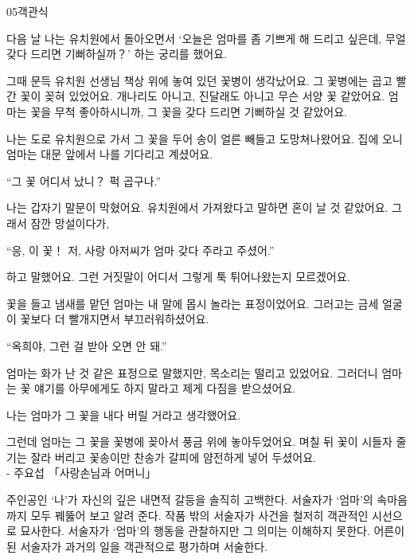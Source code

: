 \documentclass[fs9,seriesRus]{korfarm-base}
\begin{document}
\begin{kfQBlock}{05}{객관식}
\begin{kfEvidence}다음 날 나는 유치원에서 돌아오면서 ‘오늘은 엄마를 좀 기쁘게 해 드리고 싶은데, 무얼 갖다 드리면 기뻐하실까？’ 하는 궁리를 했어요.

그때 문득 유치원 선생님 책상 위에 놓여 있던 꽃병이 생각났어요. 그 꽃병에는 곱고 빨간 꽃이 꽂혀 있었어요. 개나리도 아니고, 진달래도 아니고 무슨 서양 꽃 같았어요. 엄마는 꽃을 무척 좋아하시니까, 그 꽃을 갖다 드리면 기뻐하실 것 같았어요.

나는 도로 유치원으로 가서 그 꽃을 두어 송이 얼른 빼들고 도망쳐나왔어요. 집에 오니 엄마는 대문 앞에서 나를 기다리고 계셨어요.

“그 꽃 어디서 났니？ 퍽 곱구나.”

나는 갑자기 말문이 막혔어요. 유치원에서 가져왔다고 말하면 혼이 날 것 같았어요. 그래서 잠깐 망설이다가,

“응, 이 꽃！ 저, 사랑 아저씨가 엄마 갖다 주라고 주셨어.”

하고 말했어요. 그런 거짓말이 어디서 그렇게 툭 튀어나왔는지 모르겠어요.

꽃을 들고 냄새를 맡던 엄마는 내 말에 몹시 놀라는 표정이었어요. 그러고는 금세 얼굴이 꽃보다 더 빨개지면서 부끄러워하셨어요.

“옥희야, 그런 걸 받아 오면 안 돼.”

엄마는 화가 난 것 같은 표정으로 말했지만, 목소리는 떨리고 있었어요. 그러더니 엄마는 꽃 얘기를 아무에게도 하지 말라고 제게 다짐을 받으셨어요.

나는 엄마가 그 꽃을 내다 버릴 거라고 생각했어요.

그런데 엄마는 그 꽃을 꽃병에 꽂아서 풍금 위에 놓아두었어요. 며칠 뒤 꽃이 시들자 줄기는 잘라 버리고 꽃송이만 찬송가 갈피에 얌전하게 넣어 두셨어요.   \\\relax
- 주요섭 「사랑손님과 어머니」\end{kfEvidence}
\begin{kfChoices}
\kfChoice 주인공인 ‘나’가 자신의 깊은 내면적 갈등을 솔직히 고백한다.
\kfChoice 서술자가 ‘엄마’의 속마음까지 모두 꿰뚫어 보고 알려 준다.
\kfChoice 작품 밖의 서술자가 사건을 철저히 객관적인 시선으로 묘사한다.
\kfChoice 서술자가 ‘엄마’의 행동을 관찰하지만 그 의미는 이해하지 못한다.
\kfChoice 어른이 된 서술자가 과거의 일을 객관적으로 평가하며 서술한다.
\end{kfChoices}
\end{kfQBlock}
\end{document}
